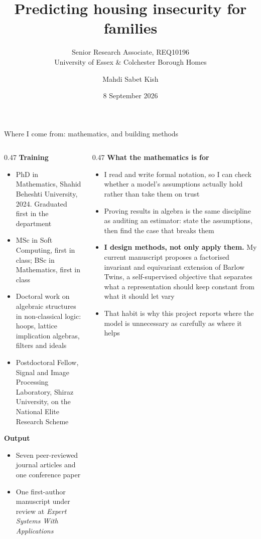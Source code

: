 \documentclass[aspectratio=169,11pt]{beamer}
\title{Predicting housing insecurity for families}
\subtitle{Senior Research Associate, REQ10196 \\ University of Essex \& Colchester Borough Homes}
\author{Mahdi Sabet Kish}
\date{8 September 2026}
\newcommand{\lead}[1]{{\color{seriesone}\bfseries #1}}
\newcommand{\point}[1]{{\color{seriestwo}\bfseries #1}}
\begin{document}
\maketitle

\begin{frame}{Where I come from: mathematics, and building methods}
  \begin{columns}[T,onlytextwidth]
    \begin{column}{0.47\textwidth}
      \lead{Training}
      \begin{itemize}\scriptsize
        \item PhD in Mathematics, Shahid Beheshti University, 2024. Graduated
              first in the department
        \item MSc in Soft Computing, first in class; BSc in Mathematics, first
              in class
        \item Doctoral work on algebraic structures in non-classical logic:
              hoops, lattice implication algebras, filters and ideals
        \item Postdoctoral Fellow, Signal and Image Processing Laboratory,
              Shiraz University, on the National Elite Research Scheme
      \end{itemize}
      \vspace{2mm}
      \lead{Output}
      \begin{itemize}\scriptsize
        \item Seven peer-reviewed journal articles and one conference paper
        \item One first-author manuscript under review at \emph{Expert Systems
              With Applications}
      \end{itemize}
    \end{column}
    \begin{column}{0.47\textwidth}
      \lead{What the mathematics is for}
      \begin{itemize}\scriptsize
        \item I read and write formal notation, so I can check whether a
              model's assumptions actually hold rather than take them on trust
        \item Proving results in algebra is the same discipline as auditing an
              estimator: state the assumptions, then find the case that breaks
              them
        \item \point{I design methods, not only apply them.} My current
              manuscript proposes a factorised invariant and equivariant
              extension of Barlow Twins, a self-supervised objective that
              separates what a representation should keep constant from what
              it should let vary
        \item That habit is why this project reports where the model is
              unnecessary as carefully as where it helps
      \end{itemize}
    \end{column}
  \end{columns}
\end{frame}
\end{document}
